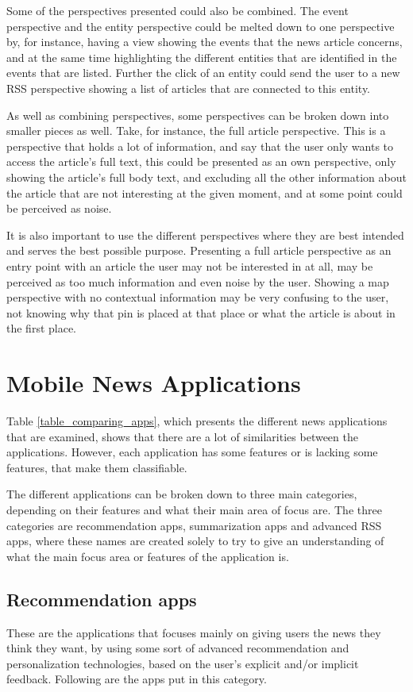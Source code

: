 Some of the perspectives presented could also be combined. The event perspective and the entity perspective could be melted down to one perspective by, for instance, having a view showing the events that the news article concerns, and at the same time highlighting the different entities that are identified in the events that are listed. Further the click of an entity could send the user to a new RSS perspective showing a list of articles that are connected to this entity.

As well as combining perspectives, some perspectives can be broken down into smaller pieces as well. Take, for instance, the full article perspective. This is a perspective that holds a lot of information, and say that the user only wants to access the article's full text, this could be presented as an own perspective, only showing the article's full body text, and excluding all the other information about the article that are not interesting at the given moment, and at some point could be perceived as noise.

It is also important to use the different perspectives where they are best intended and serves the best possible purpose. Presenting a full article perspective as an entry point with an article the user may not be interested in at all, may be perceived as too much information and even noise by the user. Showing a map perspective with no contextual information may be very confusing to the user, not knowing why that pin is placed at that place or what the article is about in the first place.

\section{Mobile News Applications}
Table \ref{table_comparing_apps}, which presents the different news applications that are examined, shows that there are a lot of similarities between the applications. However, each application has some features or is lacking some features, that make them classifiable.

The different applications can be broken down to three main categories, depending on their features and what their main area of focus are. The three categories are recommendation apps, summarization apps and advanced RSS apps, where these names are created solely to try to give an understanding of what the main focus area or features of the application is.

\subsection{Recommendation apps}
These are the applications that focuses mainly on giving users the news they think they want, by using some sort of advanced recommendation and personalization technologies, based on the user's explicit and/or implicit feedback. Following are the apps put in this category.

